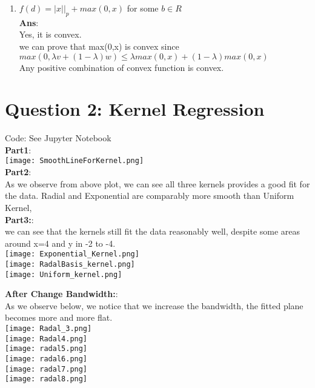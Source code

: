 \documentclass{article}
\begin{document}
\begin{enumerate}
\item  $f(d)=|x||_p + max(0,x)$ for some $b \in R$ \\
\textbf{Ans}: \\
Yes, it is convex. \\
we can prove that max(0,x) is convex since $max(0,\lambda v+(1-\lambda )w)\leq \lambda max(0,x)+ (1-\lambda)max(0,x)$ \\
Any positive combination of convex function is convex. 

\end{enumerate}

\section{Question 2: Kernel Regression}
Code: See Jupyter Notebook  \\
\textbf{Part1}: \\

\texttt{[image: SmoothLineForKernel.png]}\\
\textbf{Part2}: \\
As we observe from above plot, we can see all three kernels provides a good fit for the data. Radial and Exponential are comparably more smooth than Uniform Kernel,  \\
\textbf{Part3:}: \\

we can see that the kernels still fit the data reasonably well, despite some areas around x=4 and y in -2 to -4. \\

\texttt{[image: Exponential\_Kernel.png]}\\
\texttt{[image: RadalBasis\_kernel.png]}\\
\texttt{[image: Uniform\_kernel.png]}

\textbf{After Change Bandwidth:}: \\

As we observe below, we notice that we increase the bandwidth, the fitted plane becomes more and more flat. \\
\texttt{[image: Radal\_3.png]}\\
\texttt{[image: Radal4.png]}\\
\texttt{[image: radal5.png]}\\
\texttt{[image: radal6.png]}\\
\texttt{[image: radal7.png]}\\
\texttt{[image: radal8.png]}\\
\end{document}
